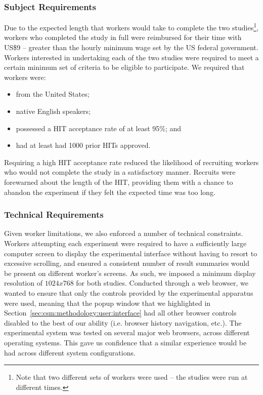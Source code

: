 \subsubsection{Subject Requirements}
Due to the expected length that workers would take to complete the two studies\footnote{Note that two different sets of workers were used -- the studies were run at different times.}, workers who completed the study in full were reimbursed for their time with US\$9 -- greater than the hourly minimum wage set by the US federal government. Workers interested in undertaking each of the two studies were required to meet a certain minimum set of criteria to be eligible to participate. We required that workers were:

\begin{itemize}
    \item{from the United States;}
    \item{native English speakers;}
    \item{possessed a HIT acceptance rate of at least 95\%; and}
    \item{had at least had 1000 prior HITs approved.}
\end{itemize}

Requiring a high HIT acceptance rate reduced the likelihood of recruiting workers who would not complete the study in a satisfactory manner. Recruits were forewarned about the length of the HIT, providing them with a chance to abandon the experiment if they felt the expected time was too long.

\subsubsection{Technical Requirements}\label{sec:csm:methodology:user:crowdsourcing:technical}
Given worker limitations, we also enforced a number of technical constraints. Workers attempting each experiment were required to have a sufficiently large computer screen to display the experimental interface without having to resort to excessive scrolling, and ensured a consistent number of result summaries would be present on different worker's screens. As such, we imposed a minimum display resolution of $1024x768$ for both studies. Conducted through a web browser, we wanted to ensure that only the controls provided by the experimental apparatus were used, meaning that the popup window that we highlighted in Section~\ref{sec:csm:methodology:user:interface} had all other browser controls disabled to the best of our ability (i.e. browser history navigation, etc.). The experimental system was tested on several major web browsers, across different operating systems. This gave us confidence that a similar experience would be had across different system configurations.

